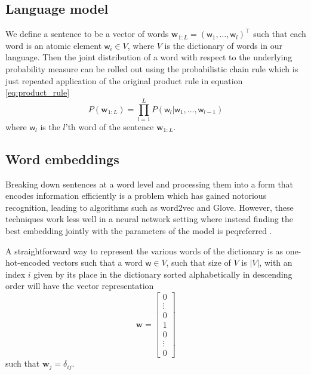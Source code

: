 \subsection{Language model}
We define a sentence to be a vector of words $\bm{w}_{1:L} = (\mathsf{w}_1, \dots,
\mathsf{w}_l)^{\top}$ such that each word is an atomic element $\mathsf{w}_i \in
V$, where $V$ is the dictionary of words in our language. Then the joint
distribution of a word with respect to the underlying probability measure can be
rolled out using the probabilistic chain rule which is just repeated application
of the original product rule in equation \eqref{eq:product_rule}
\begin{equation}
  \label{eq:conditional_language_probability}
  P(\bm{w}_{1:L}) = \prod_{l = 1}^LP(\mathsf{w}_l | \mathsf{w}_1, \dots, \mathsf{w}_{l-1})
\end{equation}
where $\mathsf{w}_l$ is the $l$'th word of the sentence $\bm{w}_{1:L}$\cite{Bengio:2003:NPL:944919.944966}.

\subsection{Word embeddings}
Breaking down sentences at a word level and processing them into a form that
encodes information efficiently is a problem which has gained notorious
recognition, leading to algorithms such as word2vec and
Glove\cite{DBLP:journals/corr/abs-1301-3781, Pennington14glove:global,
  Mikolov:2013:DRW:2999792.2999959}. However, these techniques work less well in
a neural network setting where instead finding the best embedding jointly with
the parameters of the model is peqreferred \cite[p.~5-7]{goldberg2015primer}.

A straightforward way to represent the various words of the dictionary is as
one-hot-encoded vectors such that a word $\mathsf{w} \in V$, such that size of
$V$ is $|V|$, with an index $i$ given by its place in the dictionary sorted
alphabetically in descending order will have the vector representation
\begin{equation}
  \label{eq:one_hot_encoding}
  \bm{w} =
  \begin{bmatrix}
    0 \\
    \vdots \\
    0 \\
    1 \\
    0 \\
    \vdots \\
    0
  \end{bmatrix}
\end{equation}\cite[p.~6]{goldberg2015primer}
such that $\bm{w}_{j} = \delta_{ij}$.

